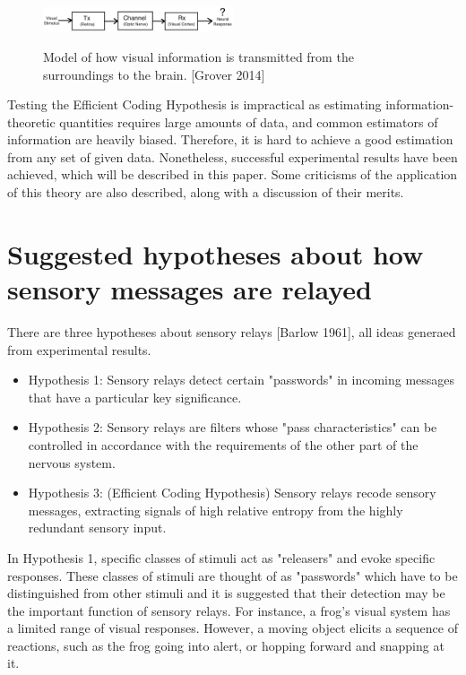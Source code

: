 \documentclass[twoside]{article}
\begin{document}
\begin{multicols}{2}
\begin{figure}[H]
	\caption{
		Model of how visual information is transmitted from the surroundings to the brain. [Grover 2014]
	}
	\includegraphics[width=0.5\textwidth]{model}
	\label{fig:model}
\end{figure}

Testing the Efficient Coding Hypothesis is impractical as estimating information-theoretic quantities requires large amounts of data, and common estimators of information are heavily biased. Therefore, it is hard to achieve a good estimation from any set of given data. Nonetheless, successful experimental results have been achieved, which will be described in this paper. Some criticisms of the application of this theory are also described, along with a discussion of their merits. 





\section{Suggested hypotheses about how sensory messages are relayed}

There are three hypotheses about sensory relays [Barlow 1961], all ideas generaed from experimental results.
\begin{itemize}
	\item Hypothesis 1: Sensory relays detect certain "passwords" in incoming messages that have a particular key significance.
	\item Hypothesis 2: Sensory relays are filters whose "pass characteristics" can be controlled in accordance with the requirements of the other part of the nervous system.
	\item Hypothesis 3: (Efficient Coding Hypothesis) Sensory relays recode sensory messages, extracting signals of high relative entropy from the highly redundant sensory input.
\end{itemize}

In Hypothesis 1, specific classes of stimuli act as "releasers" and evoke specific responses. These classes of stimuli are thought of as "passwords" which have to be distinguished from other stimuli and it is suggested that their detection may be the important function of sensory relays. For instance, a frog's visual system has a limited range of visual responses. However, a moving object elicits a sequence of reactions, such as the frog going into alert, or hopping forward and snapping at it.


\end{multicols}
\end{document}
